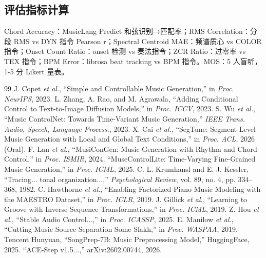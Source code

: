 \documentclass[conference]{IEEEtran}
\begin{document}
\subsection{评估指标计算}
Chord Accuracy：MusicLang Predict 和弦识别→匹配率；RMS Correlation：分段 RMS vs DYN 指令 Pearson r；Spectral Centroid MAE：频谱质心 vs COLOR 指令；Onset Count Ratio：onset 检测 vs 奏法指令；ZCR Ratio：过零率 vs TEX 指令；BPM Error：librosa beat tracking vs BPM 指令。MOS：5 人盲听，1-5 分 Likert 量表。

\begin{thebibliography}{99}
 J. Copet \textit{et al.}, ``Simple and Controllable Music Generation,'' in \textit{Proc. NeurIPS}, 2023.
 L. Zhang, A. Rao, and M. Agrawala, ``Adding Conditional Control to Text-to-Image Diffusion Models,'' in \textit{Proc. ICCV}, 2023.
 S. Wu \textit{et al.}, ``Music ControlNet: Towards Time-Variant Music Generation,'' \textit{IEEE Trans. Audio, Speech, Language Process.}, 2023.
 X. Cai \textit{et al.}, ``SegTune: Segment-Level Music Generation with Local and Global Text Conditions,'' in \textit{Proc. ACL}, 2026 (Oral).
 F. Lan \textit{et al.}, ``MusiConGen: Music Generation with Rhythm and Chord Control,'' in \textit{Proc. ISMIR}, 2024.
 ``MuseControlLite: Time-Varying Fine-Grained Music Generation,'' in \textit{Proc. ICML}, 2025.
 C. L. Krumhansl and E. J. Kessler, ``Tracing... tonal organization...,'' \textit{Psychological Review}, vol. 89, no. 4, pp. 334--368, 1982.
 C. Hawthorne \textit{et al.}, ``Enabling Factorized Piano Music Modeling with the MAESTRO Dataset,'' in \textit{Proc. ICLR}, 2019.
 J. Gillick \textit{et al.}, ``Learning to Groove with Inverse Sequence Transformations,'' in \textit{Proc. ICML}, 2019.
 Z. Hou \textit{et al.}, ``Stable Audio Control...,'' in \textit{Proc. ICASSP}, 2025.
 E. Manilow \textit{et al.}, ``Cutting Music Source Separation Some Slakh,'' in \textit{Proc. WASPAA}, 2019.
 Tencent Hunyuan, ``SongPrep-7B: Music Preprocessing Model,'' HuggingFace, 2025.
 ``ACE-Step v1.5...,'' arXiv:2602.00744, 2026.
\end{thebibliography}
\end{document}
